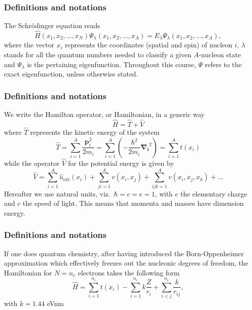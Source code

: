 \documentclass[compress]{beamer}
\begin{document}
\frame
{
  \frametitle{Definitions and notations}
\begin{small}
{\scriptsize
The Schr\"odinger equation reads 
\begin{equation}
\hat{H}(x_1, x_2, \dots , x_N) \Psi_{\lambda}(x_1, x_2, \dots , x_A) = 
E_\lambda  \Psi_\lambda(x_1, x_2, \dots , x_A), 
\label{eq:basicSE1}
\end{equation}
where the vector $x_i$ represents the coordinates (spatial and spin) of nucleon $i$, $\lambda$ stands  for all the quantum
numbers needed to classify a given $A$-nucleon state and $\Psi_{\lambda}$ is the pertaining eigenfunction.  Throughout this course,
$\Psi$ refers to the exact eigenfunction, unless otherwise stated.
}
\end{small}
}

\frame
{
  \frametitle{Definitions and notations}
\begin{small}
{\scriptsize
We write the Hamilton operator, or Hamiltonian,  in a generic way 
\[
	\hat{H} = \hat{T} + \hat{V} 
\]
where $\hat{T}$  represents the kinetic energy of the system
\[
	\hat{T} = \sum_{i=1}^A \frac{\mathbf{p}_i^2}{2m_i} = \sum_{i=1}^A \left( -\frac{\hbar^2}{2m_i} \mathbf{\nabla_i}^2 \right) =
		\sum_{i=1}^A t(x_i)
\]
while the operator $\hat{V}$ for the potential energy is given by
\begin{equation}
	\hat{V} = \sum_{i=1}^A \hat{u}_{\mathrm{ext}}(x_i) + \sum_{ji=1}^A v(x_i,x_j)+\sum_{ijk=1}^Av(x_i,x_j,x_k)+\dots
\label{eq:firstv}
\end{equation}
Hereafter we use natural units, viz.~$\hbar=c=e=1$, with $e$ the elementary charge and $c$ the speed of light. This means that momenta and masses
have dimension energy. 
}
\end{small}
}
\frame
{
  \frametitle{Definitions and notations}
\begin{small}
{\scriptsize
If one does quantum chemistry, after having introduced the  Born-Oppenheimer approximation which effectively freezes out the nucleonic degrees
of freedom, the Hamiltonian for $N=n_e$ electrons takes the following form 
\[
  \hat{H} = \sum_{i=1}^{n_e} t(x_i) 
  - \sum_{i=1}^{n_e} k\frac{Z}{r_i} + \sum_{i<j}^{n_e} \frac{k}{r_{ij}},
\]
with $k=1.44$ eVnm
}
\end{small}
}
\end{document}
